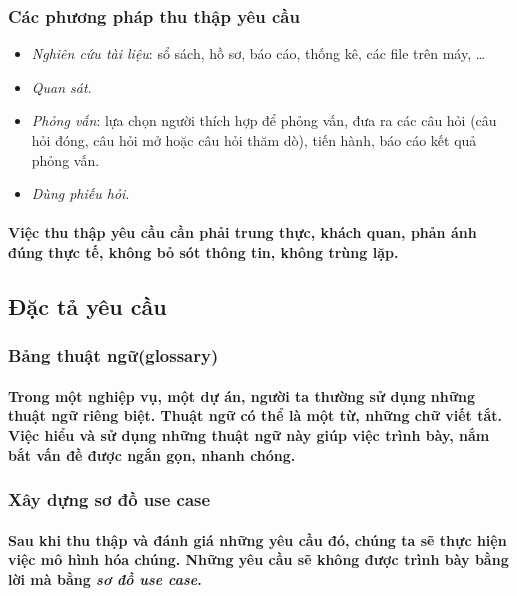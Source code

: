 \documentclass{article}
\begin{document}
  \subsubsection{Các phương pháp thu thập yêu cầu}
    \begin{itemize}
      \item \textit{Nghiên cứu tài liệu}: sổ sách, hồ sơ, báo cáo, thống kê, các file trên máy, \ldots
      \item \textit{Quan sát}.
      \item \textit{Phỏng vấn}: lựa chọn người thích hợp để phỏng vấn, đưa ra các câu hỏi (câu hỏi đóng, câu hỏi mở hoặc câu hỏi thăm dò), tiến hành, báo cáo kết quả phỏng vấn.
      \item \textit{Dùng phiếu hỏi}.
    \end{itemize}

    \paragraph{\textnormal{
      Việc thu thập yêu cầu cần phải trung thực, khách quan, phản ánh đúng thực tế, không bỏ sót thông tin, không trùng lặp.
    }}

  \subsection{Đặc tả yêu cầu}

    \subsubsection{Bảng thuật ngữ(glossary)}
      \paragraph{\textnormal{
        Trong một nghiệp vụ, một dự án, người ta thường sử dụng những thuật ngữ riêng biệt. Thuật ngữ có thể là một từ, những chữ viết tắt. Việc hiểu và sử dụng những thuật ngữ này giúp việc trình bày, nắm bắt vấn đề được ngắn gọn, nhanh chóng.
      }}
    
    \subsubsection{Xây dựng sơ đồ use case}
      \paragraph{\textnormal{
        Sau khi thu thập và đánh giá những yêu cầu đó, chúng ta sẽ thực hiện việc mô hình hóa chúng. Những yêu cầu sẽ không được trình bày bằng lời mà bằng \textit{sơ đồ use case}.
      }}
\end{document}
